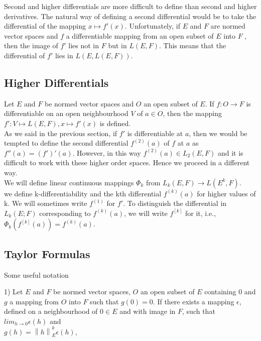 \documentclass[12 pt]{article}
\theoremstyle{definition}
\theoremstyle{remark}
\newcommand\norm[1]{\left\lVert#1\right\rVert}
\begin{document}
Second and higher differentials are more difficult to define than second and higher
derivatives. The natural way of defining a second differential would be to take the
differential of the mapping $x \mapsto f'(x)$. Unfortunately, if $E$ and $F$ are normed
vector spaces and $f$ a differentiable mapping from an open subset of $E$ into $F$ ,
then the image of $f'$ lies not in $F$ but in $L(E,F)$. This means that the differential
of $f'$ lies in $L(E,L(E,F))$.\\

\subsection{Higher Differentials}
Let $E$ and $F$ be normed vector spaces and $O$ an open subset of $E$. If $f: O \to F$ is differentiable on an open neighbourhood $V$ of $a \in O$, then the mapping\\
\hspace*{3cm} $f': V \mapsto L(E,F), x \mapsto f'(x)$ is defined.\\


As we said in the previous section, if $f'$ is differentiable at $a$, then we would be tempted to define the second differential $f^{(2)}(a)$ of $f$ at $a$ as $f''(a) = (f')'(a)$. However, in this way $f^{(2)}(a) \in L_2(E,F)$ and it is difficult to work with these higher order spaces. Hence we proceed in a different way.\\

We will define linear continuous mappings $\Phi_k$ from $L_k (E, F) \to L(E^k, F)$. \\

we define k-differentiability and the kth differential $f^{(k)}(a)$ for higher values of k. We will sometimes write $f^{(1)}$ for $f'$. To distinguish the differential in $L_k(E; F)$  corresponding to $f^{(k)}(a)$, we will write $f^{[k]}$ for it, i.e., $\Phi_k (f^{[k]}(a)) = f^{(k)}(a)$.\\

\subsection{Taylor Formulas}
\normalfont
Some useful notation

1) Let $E$ and $F$ be normed vector spaces, $O$ an open subset of $E$ containing 0 and $g$
a mapping from $O$ into $F$ such that $g(0) = 0$. If there exists a mapping $\epsilon$, defined
on a neighbourhood of $0 \in E$ and with image in $F$, such that $lim_{h \to 0} \epsilon (h)$ and \\
\hspace*{3cm}			$g(h) = \norm{h}_E^k \epsilon(h)$,\\
\end{document}
